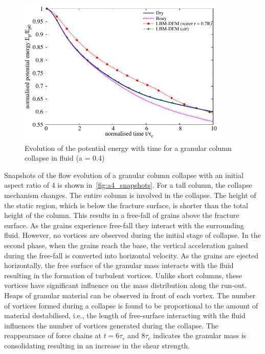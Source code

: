 \begin{figure}
	\centering
    \includegraphics[width=0.9\textwidth]{PE_a04f}
    \caption{Evolution of the potential energy with time for a granular column 
    collapse in fluid (a = 0.4)}
    \label{fig:PE_a04f}
\end{figure}


Snapshots of the flow evolution of a granular column collapse with an initial 
aspect ratio of 4 is shown in~\cref{fig:a4_snapshots}. For a tall column, the 
collapse mechanism changes. The entire column is involved in the collapse. The 
height of the static region, which is below the fracture surface, is shorter 
than the total height of the column. This results in a free-fall of grains 
above the fracture surface. As the grains experience free-fall they interact 
with the surrounding fluid. However, no vortices are observed during the 
initial stage of collapse. In the second phase, when the grains reach the base, 
the vertical acceleration gained during the free-fall is converted into
horizontal velocity. As the grains are ejected horizontally, the free 
surface of the granular mass interacts with the fluid resulting in the 
formation of turbulent vortices. Unlike short columns, these vortices have 
significant influence on the mass distribution along the run-out. Heaps of 
granular material can be observed in front of each vortex. The number of 
vortices formed during a collapse is found to be proportional to the amount of 
material destabilised, i.e., the length of free-surface interacting with the 
fluid influences the number of vortices generated during the collapse. The 
reappearance of force chains at $t = 6\tau_c$ and $8\tau_c$ indicates the 
granular mass is consolidating resulting in an increase in the shear strength. 

